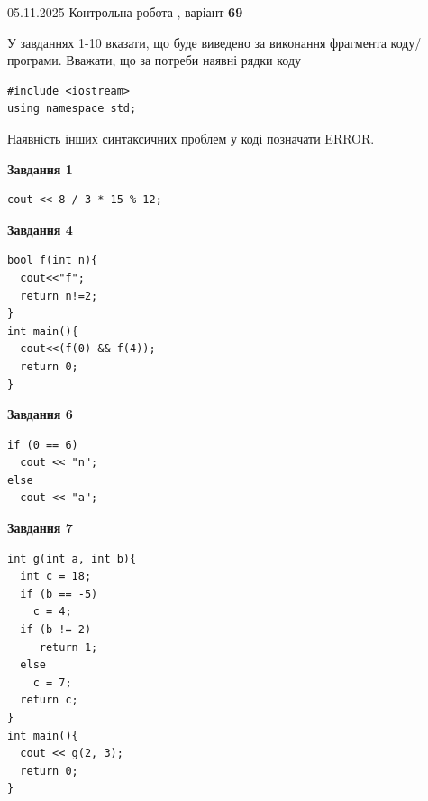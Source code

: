\documentclass[12pt, ukrainian]{article}
\begin{document}
\newpage

{\Large{05.11.2025 Контрольна робота , варіант  \No \textbf { 69 }\par}}
{
\begin {large}
У завданнях 1-10 вказати, що буде виведено за виконання фрагмента коду/про\-гра\-ми.
Вважати, що за потреби наявні рядки коду
\begin{verbatim}
#include <iostream>
using namespace std;
\end{verbatim}
Наявність інших синтаксичних проблем у коді позначати ERROR.

\begin{minipage}[t]{7.0cm}

\begin{center}
\textbf{Завдання 1}
\end{center}
\vspace{-8mm}

\begin{verbatim}
cout << 8 / 3 * 15 % 12;
\end{verbatim}



\begin{center}
\textbf{Завдання 4}
\end{center}
\vspace{-8mm}

\begin{verbatim}
bool f(int n){
  cout<<"f";
  return n!=2;
}
int main(){
  cout<<(f(0) && f(4));
  return 0;
}
\end{verbatim}



\begin{center}
\textbf{Завдання 6}
\end{center}
\vspace{-8mm}

\begin{verbatim}
if (0 == 6)
  cout << "n";
else
  cout << "a";
\end{verbatim}



\begin{center}
\textbf{Завдання 7}
\end{center}
\vspace{-8mm}

\begin{verbatim}
int g(int a, int b){
  int c = 18;
  if (b == -5)
    c = 4;
  if (b != 2)
     return 1;
  else
    c = 7;
  return c;
}
int main(){
  cout << g(2, 3);
  return 0;
}
\end{verbatim}


\end{minipage}
\end{large}}
\end{document}
